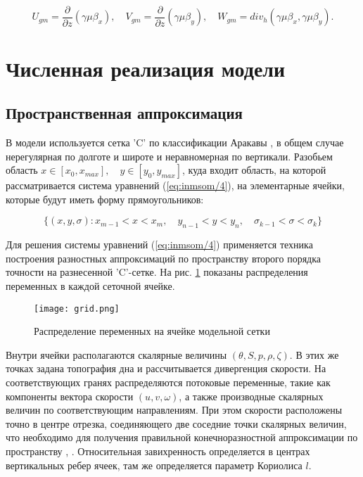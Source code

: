 	\[U_{gm} =\frac{\partial }{\partial z} \left(\gamma \mu \beta _{x} \right),\quad V_{gm} =\frac{\partial }{\partial z} \left(\gamma \mu \beta _{y} \right),\quad W_{gm} =div_{h} \left(\gamma \mu \beta _{x} ,\gamma \mu \beta _{y} \right).\] 
		
	
\section{Численная реализация модели}\label{sec:inmsom/ch1/sec2}
\subsection{Пространственная аппроксимация}
	В модели используется сетка 'C' по классификации Аракавы \cite{ARAKAWA1977}, \cite{ARAKAWA1976}
	в общем случае нерегулярная по долготе и широте и неравномерная по вертикали.
	Разобьем область $x \in [x_0, x_{max}], \quad y \in [y_0, y_{max}] $, куда входит область, на которой рассматривается система уравнений (\ref{eq:inmsom/4}),
	на элементарные ячейки, которые будут иметь форму прямоугольников:
	
	$$ \{ (x, y, \sigma) : x_{m-1} < x < x_{m}, \quad y_{n-1} < y < y_{n}, \quad \sigma_{k-1} < \sigma < \sigma_{k} \} $$
	
	Для решения системы уравнений (\ref{eq:inmsom/4}) применяется техника построения разностных аппроксимаций по пространству второго порядка точности на разнесенной 
	'C'-сетке. На рис. \ref{fig:3dgrid} показаны распределения переменных в каждой сеточной ячейке. 
	
	\begin{figure}[htb!]
	\center
	\texttt{[image: grid.png]}
	\caption{Распределение переменных на ячейке модельной сетки}
	\label{fig:3dgrid}
	\end{figure}
	
	Внутри ячейки располагаются
	скалярные величины $(\theta, S, p, \rho, \zeta)$. В этих же точках задана топография дна и рассчитывается дивергенция скорости. На соответствующих гранях
	распределяются потоковые переменные, такие как компоненты вектора скорости $(u, v, \omega)$, а также производные скалярных величин по соответствующим
	направлениям. При этом скорости расположены точно в центре отрезка, соединяющего две соседние точки скалярных величин, что необходимо для получения
	правильной конечноразностной аппроксимации по пространству \cite{ROUCH}, \cite{MARCHUK}. Относительная завихренность определяется в центрах вертикальных ребер ячеек, там же
	определяется параметр Кориолиса $l$.
	
